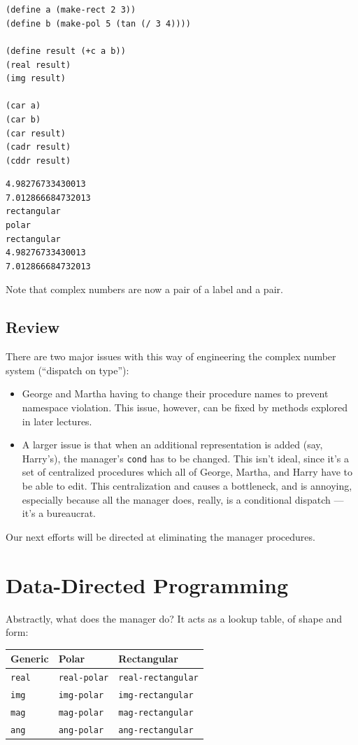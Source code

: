 \documentclass[9pt]{report}
\begin{document}
\begin{verbatim}







(define a (make-rect 2 3))
(define b (make-pol 5 (tan (/ 3 4))))

(define result (+c a b))
(real result)
(img result)

(car a)
(car b)
(car result)
(cadr result)
(cddr result)
\end{verbatim}

\begin{verbatim}
4.98276733430013
7.012866684732013
rectangular
polar
rectangular
4.98276733430013
7.012866684732013
\end{verbatim}


Note that complex numbers are now a pair of a label and a pair.

\subsection{Review}
\label{sec:orgbf75787}
There are two major issues with this way of engineering the
complex number system (``dispatch on type''):
\begin{itemize}
\item George and Martha having to change their procedure names to
prevent namespace violation. This issue, however, can be fixed
by methods explored in later lectures.
\item A larger issue is that when an additional representation is
added (say, Harry's), the manager's \texttt{cond} has to be changed.
This isn't ideal, since it's a set of centralized procedures
which all of George, Martha, and Harry have to be able to edit.
This centralization and causes a bottleneck, and is annoying,
especially because all the manager does, really, is a
conditional dispatch --- it's a bureaucrat.
\end{itemize}

Our next efforts will be directed at eliminating the manager
procedures.

\section{Data-Directed Programming}
\label{sec:orgb99ee69}

Abstractly, what does the manager do? It acts as a lookup table, of
shape and form:

\begin{center}
\begin{tabular}{lll}
\toprule
Generic & Polar & Rectangular\\
\midrule
\texttt{real} & \texttt{real-polar} & \texttt{real-rectangular}\\
\texttt{img} & \texttt{img-polar} & \texttt{img-rectangular}\\
\texttt{mag} & \texttt{mag-polar} & \texttt{mag-rectangular}\\
\texttt{ang} & \texttt{ang-polar} & \texttt{ang-rectangular}\\
\bottomrule
\end{tabular}
\end{center}
\end{document}
